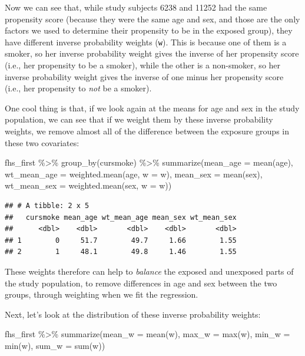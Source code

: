 \documentclass[
]{book}
\newenvironment{Shaded}{\begin{snugshade}}{\end{snugshade}}
\newcommand{\AttributeTok}[1]{\textcolor[rgb]{0.77,0.63,0.00}{#1}}
\newcommand{\FunctionTok}[1]{\textcolor[rgb]{0.00,0.00,0.00}{#1}}
\newcommand{\NormalTok}[1]{#1}
\newcommand{\SpecialCharTok}[1]{\textcolor[rgb]{0.00,0.00,0.00}{#1}}
\begin{document}
Now we can see that, while study subjects 6238 and 11252 had the same propensity score (because they were the same age and sex, and those are the only factors we used to determine their propensity to be in the exposed group), they have different inverse probability weights (\texttt{w}). This is because one of them is a smoker, so her inverse probability weight gives the inverse of her propensity score (i.e., her propensity to be a smoker), while the other is a non-smoker, so her inverse probability weight gives the inverse of one minus her propensity score (i.e., her propensity to \emph{not} be a smoker).

One cool thing is that, if we look again at the means for age and sex in the study population, we can see that if we weight them by these inverse probability weights, we remove almost all of the difference between the exposure groups in these two covariates:

\begin{Shaded}
\begin{Highlighting}[]
\NormalTok{fhs\_first }\SpecialCharTok{\%\textgreater{}\%} 
  \FunctionTok{group\_by}\NormalTok{(cursmoke) }\SpecialCharTok{\%\textgreater{}\%} 
  \FunctionTok{summarize}\NormalTok{(}\AttributeTok{mean\_age =} \FunctionTok{mean}\NormalTok{(age), }
            \AttributeTok{wt\_mean\_age =} \FunctionTok{weighted.mean}\NormalTok{(age, }\AttributeTok{w =}\NormalTok{ w), }
            \AttributeTok{mean\_sex =} \FunctionTok{mean}\NormalTok{(sex),}
            \AttributeTok{wt\_mean\_sex =} \FunctionTok{weighted.mean}\NormalTok{(sex, }\AttributeTok{w =}\NormalTok{ w))}
\end{Highlighting}
\end{Shaded}

\begin{verbatim}
## # A tibble: 2 x 5
##   cursmoke mean_age wt_mean_age mean_sex wt_mean_sex
##      <dbl>    <dbl>       <dbl>    <dbl>       <dbl>
## 1        0     51.7        49.7     1.66        1.55
## 2        1     48.1        49.8     1.46        1.55
\end{verbatim}

These weights therefore can help to \emph{balance} the exposed and unexposed parts of the study population, to remove differences in age and sex between the two groups, through weighting when we fit the regression.

Next, let's look at the distribution of these inverse probability weights:

\begin{Shaded}
\begin{Highlighting}[]
\NormalTok{fhs\_first }\SpecialCharTok{\%\textgreater{}\%}
  \FunctionTok{summarize}\NormalTok{(}\AttributeTok{mean\_w =} \FunctionTok{mean}\NormalTok{(w),}
            \AttributeTok{max\_w =} \FunctionTok{max}\NormalTok{(w),}
            \AttributeTok{min\_w =} \FunctionTok{min}\NormalTok{(w),}
            \AttributeTok{sum\_w =} \FunctionTok{sum}\NormalTok{(w))}
\end{Highlighting}
\end{Shaded}
\end{document}
